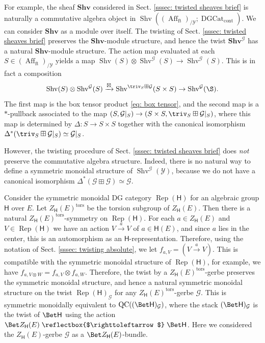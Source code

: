 \documentclass[10pt]{amsart}
\def\acts{\mathrel{\reflectbox{$\righttoleftarrow$}}}
\theoremstyle{remark}
\newcommand{\on}{\operatorname}
\newcommand{\cG}{\mathcal{G}}
\newcommand{\cY}{\mathcal{Y}}
\newcommand{\DGcat}{\on{DGCat}_{\on{cont}}}
\newcommand{\Rep}{\on{Rep}}
\newcommand{\QC}{\on{QC}}
\newcommand{\Shv}{\on{Shv}}
\newcommand{\Affft}{\on{Aff}_{\on{ft}}}
\begin{document}
For example, the sheaf $\textbf{Shv}$ considered in Sect. \ref{sssec: twisted sheaves brief} is naturally a commutative algebra object in $\Shv((\Affft)_{/\cY};\DGcat)$. We can consider $\textbf{Shv}$ as a module over itself. The twisting of Sect. \ref{sssec: twisted sheaves brief} preserves the $\textbf{Shv}$-module structure, and hence the twist $\textbf{Shv}^{\cG}$ has a natural $\textbf{Shv}$-module structure. The action map evaluated at each $S\in (\Affft)_{/\cY}$ yields a map $\Shv(S)\otimes \Shv^{\cG}(S)\rightarrow\Shv^{\cG}(S)$. This is in fact a composition 
\[\Shv(S)\otimes \Shv^{\cG}(S)\xrightarrow{\boxtimes}\Shv^{\triv_{S}\boxplus\cG}(S\times S)\rightarrow\Shv^{\cG}(\S).\]
The first map is the box tensor product \eqref{eq: box tensor}, and the second map is a $*$-pullback associated to the map $(S,\cG|_S)\rightarrow (S\times S,\triv_{S}\boxplus \cG|_S)$, where this map is determined by $\Delta:S\rightarrow S\times S$ together with the canonical isomorphism $\Delta^*(\triv_{S}\boxplus \cG|_S)\simeq \cG|_S$.
\medskip

However, the twisting procedure of Sect. \ref{sssec: twisted sheaves brief} does \emph{not} preserve the commutative algebra structure. Indeed, there is no natural way to define a symmetric monoidal structure of $\Shv^{\cG}(\cY)$, because we do not have a canonical isomorphism $\Delta^*(\cG\boxplus\cG)\simeq \cG$.
\medskip

Consider the symmetric monoidal DG category $\Rep(\mathsf{H})$ for an algebraic group $\mathsf{H}$ over $E$. Let $Z_{\mathsf{H}}(E)^{\on{tors}}$ be the torsion subgroup of $Z_{\mathsf{H}}(E)$. Then there is a natural $Z_{\mathsf{H}}(E)^{\on{tors}}$-symmetry on $\Rep(\mathsf{H})$. For each $a\in Z_{\mathsf{H}}(E)$ and $V\in\Rep(\mathsf{H})$ we have an action  $V\xrightarrow{a} V$ of $a\in \mathsf{H}(E)$, and since $a$ lies in the center, this is an automorphism as an $\mathsf{H}$-representation. Therefore, using the notation of Sect. \ref{sssec: twisting absolute}, we let $f_{a,V}= (V\xrightarrow{a} V)$. This is compatible with the symmetric monoidal structure of $\Rep(\mathsf{H})$, for example, we have $f_{a,V\otimes W}=f_{a,V}\otimes f_{a,W}$. Therefore, the twist by a $Z_{\mathsf{H}}(E)^{\on{tors}}$-gerbe preserves the symmetric monoidal structure, and hence a natural symmetric monoidal structure on the twist $\Rep(\mathsf{H})_{\cG}$ for any $Z_{\mathsf{H}}(E)^{\on{tors}}$-gerbe $\cG$. This is symmetric monoidally equivalent to $\QC((\Bet\mathsf{H})_{\cG})$, where the stack $(\Bet\mathsf{H})_{\cG}$ is the twist of $\Bet \mathsf{H}$ using the action $\Bet Z_{\mathsf{H}}(E)\acts \Bet \mathsf{H}$. Here we considered the $Z_{\mathsf{H}}(E)$-gerbe $\cG$ as a $\Bet Z_{\mathsf{H}}(E)$-bundle.
\end{document}

